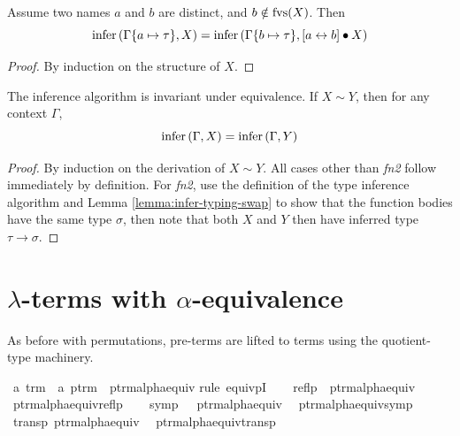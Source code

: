 \begin{lemma}
\label{lemma:infer-typing-swap}
Assume two names \(a\) and \(b\) are distinct, and \(b \notin \mathrm{fvs}(X)\).
Then
\[
\mathrm{infer}\left(\Gamma\{a \mapsto \tau\}, X\right) = \mathrm{infer}\left(\Gamma\{b \mapsto \tau\}, [a \leftrightarrow b] \bullet X\right)
\]
\end{lemma}
\begin{proof}
By induction on the structure of \(X\).
\end{proof}

\begin{theorem}
The inference algorithm is invariant under equivalence.
If \(X \sim Y\), then for any context \(\Gamma\),
\[
\mathrm{infer}\left(\Gamma, X\right) = \mathrm{infer}\left(\Gamma, Y\right)
\]
\end{theorem}
\begin{proof}
By induction on the derivation of \(X \sim Y\).
All cases other than \emph{fn2} follow immediately by definition.
For \emph{fn2}, use the definition of the type inference algorithm and Lemma \ref{lemma:infer-typing-swap} to show that the function bodies have the same type \(\sigma\), then note that both \(X\) and \(Y\) then have inferred type \(\tau \to \sigma\).
\end{proof}

\section{\(\lambda\)-terms with \(\alpha\)-equivalence}
\label{sec:quotient-terms}
As before with permutations, pre-terms are lifted to terms using the quotient-type machinery.

\begin{implementation}
\isamarkupfalse%
\ {\isacharprime}a\ trm\ {\isacharequal}\ {\isachardoublequoteopen}{\isacharprime}a\ ptrm{\isachardoublequoteclose}\ {\isacharslash}\ ptrm{\isacharunderscore}alpha{\isacharunderscore}equiv\isanewline
%
\isadelimproof
%
\endisadelimproof
%
\isatagproof
{}\isamarkupfalse%
{\isacharparenleft}rule\ equivpI{\isacharparenright}\isanewline
\ \ \isamarkupfalse%
\ {\isachardoublequoteopen}reflp\ \ ptrm{\isacharunderscore}alpha{\isacharunderscore}equiv{\isachardoublequoteclose}\ \isamarkupfalse%
\ ptrm{\isacharunderscore}alpha{\isacharunderscore}equiv{\isacharunderscore}reflp\isacommand{{\isachardot}}\isamarkupfalse%
\isanewline
\ \ \isamarkupfalse%
\ {\isachardoublequoteopen}symp\ \ \ ptrm{\isacharunderscore}alpha{\isacharunderscore}equiv{\isachardoublequoteclose}\ \isamarkupfalse%
\ ptrm{\isacharunderscore}alpha{\isacharunderscore}equiv{\isacharunderscore}symp\isacommand{{\isachardot}}\isamarkupfalse%
\isanewline
\ \ \isamarkupfalse%
\ {\isachardoublequoteopen}transp\ ptrm{\isacharunderscore}alpha{\isacharunderscore}equiv{\isachardoublequoteclose}\ \isamarkupfalse%
\ ptrm{\isacharunderscore}alpha{\isacharunderscore}equiv{\isacharunderscore}transp\isacommand{{\isachardot}}\isamarkupfalse%
\isanewline
{}\isamarkupfalse%
%
\endisatagproof
\end{implementation}

